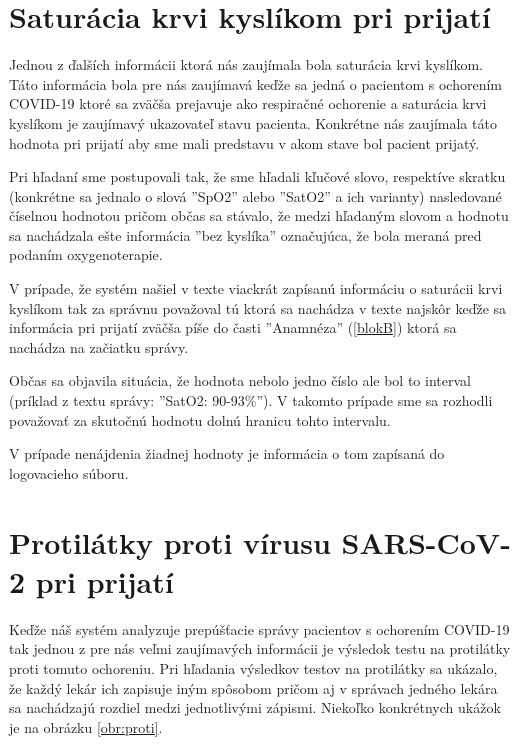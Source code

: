 \section{Saturácia krvi kyslíkom pri prijatí}
\label{saturacia}

Jednou z ďalších informácii ktorá nás zaujímala bola saturácia krvi kyslíkom. Táto informácia bola pre nás zaujímavá keďže sa jedná o pacientom s ochorením COVID-19 ktoré sa zväčša prejavuje ako respiračné ochorenie a saturácia krvi kyslíkom je zaujímavý ukazovateľ stavu pacienta. Konkrétne nás zaujímala táto hodnota pri prijatí aby sme mali predstavu v akom stave bol pacient prijatý. 

Pri hľadaní sme postupovali tak, že sme hľadali kľučové slovo, respektíve skratku (konkrétne sa jednalo o slová ''SpO2'' alebo ''SatO2'' a ich varianty) nasledované číselnou hodnotou pričom občas sa stávalo, že medzi hľadaným slovom a hodnotu sa nachádzala ešte informácia ''bez kyslíka'' označujúca, že bola meraná pred podaním oxygenoterapie.

V prípade, že systém našiel v texte viackrát zapísanú informáciu o saturácii krvi kyslíkom tak za správnu považoval tú ktorá sa nachádza v texte najskôr keďže sa informácia pri prijatí zväčša píše do časti ''Anamnéza'' (\ref{blokB}) ktorá sa nachádza na začiatku správy.

Občas sa objavila situácia, že hodnota nebolo jedno číslo ale bol to interval (príklad z textu správy: ''SatO2: 90-93\%''). V takomto prípade sme sa rozhodli považovať za skutočnú hodnotu dolnú hranicu tohto intervalu.

V prípade nenájdenia žiadnej hodnoty je informácia o tom zapísaná do logovacieho súboru. 

\section{Protilátky proti vírusu SARS-CoV-2 pri prijatí}
\label{protilatky}

Keďže náš systém analyzuje prepúšťacie správy pacientov s ochorením COVID-19 tak jednou z pre nás veľmi zaujímavých informácii je výsledok testu na protilátky proti tomuto ochoreniu. Pri hľadania výsledkov testov na protilátky sa ukázalo, že každý lekár ich zapisuje iným spôsobom pričom aj v správach jedného lekára sa nachádzajú rozdiel medzi jednotlivými zápismi. Niekoľko konkrétnych ukážok je na obrázku \ref{obr:proti}. 


